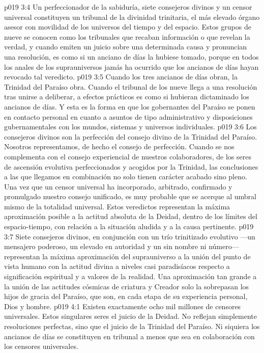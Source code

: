 \vs p019 3:4 \pc Un perfeccionador de la sabiduría, siete consejeros divinos y un censor universal constituyen un tribunal de la divinidad trinitaria, el más elevado órgano asesor con movilidad de los universos del tiempo y del espacio. Estos grupos de nueve se conocen como los tribunales que recaban información o que revelan la verdad, y cuando emiten un juicio sobre una determinada causa y pronuncian una resolución, es como si un anciano de días la hubiese tomado, porque en todos los anales de los suprauniversos jamás ha ocurrido que los ancianos de días hayan revocado tal veredicto.
\vs p019 3:5 Cuando los tres ancianos de días obran, la Trinidad del Paraíso obra. Cuando el tribunal de los nueve llega a una resolución tras unirse a deliberar, a efectos prácticos es como si hubieran dictaminado los ancianos de días. Y esta es la forma en que los gobernantes del Paraíso se ponen en contacto personal en cuanto a asuntos de tipo administrativo y disposiciones gubernamentales con los mundos, sistemas y universos individuales.
\vs p019 3:6 \pc Los consejeros divinos son la perfección del consejo divino de la Trinidad del Paraíso. Nosotros representamos, de hecho  el consejo de perfección. Cuando se nos complementa con el consejo experiencial de nuestros colaboradores, de los seres de ascensión evolutiva perfeccionados y acogidos por la Trinidad, las conclusiones a las que llegamos en combinación no solo tienen carácter acabado sino pleno. Una vez que un censor universal ha incorporado, arbitrado, confirmado y promulgado nuestro consejo unificado, es muy probable que se acerque al umbral mismo de la totalidad universal. Estos veredictos representan la máxima aproximación posible a la actitud absoluta de la Deidad, dentro de los límites del espacio\hyp{}tiempo, con relación a la situación aludida y a la causa pertinente.
\vs p019 3:7 Siete consejeros divinos, en conjunción con un trío trinitizado evolutivo ---un mensajero poderoso, un elevado en autoridad y un sin nombre ni número--- representan la máxima aproximación del suprauniverso a la unión del punto de vista humano con la actitud divina a niveles casi paradisíacos respecto a significación espiritual y a valores de la realidad. Una aproximación tan grande a la unión de las actitudes cósmicas de criatura y Creador solo la sobrepasan los hijos de gracia del Paraíso, que son, en cada etapa de su experiencia personal, Dios y hombre.
\vs p019 4:1 Existen exactamente ocho mil millones de censores universales. Estos singulares seres  el juicio de la Deidad. No reflejan simplemente resoluciones perfectas, sino que  el juicio de la Trinidad del Paraíso. Ni siquiera los ancianos de días se constituyen en tribunal a menos que sea en colaboración con los censores universales.

